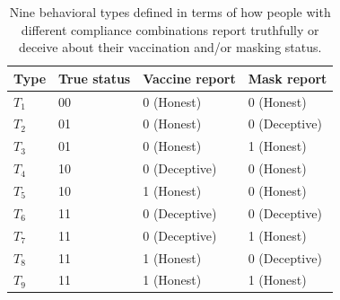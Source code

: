 \documentclass[sigconf,review]{acmart}
\begin{document}
\begin{table}[t]
\centering
\caption{Nine behavioral types defined in terms of how people with different compliance combinations report truthfully or deceive about their vaccination and/or masking status.}
\label{tab:truth-table-9types}
\begin{tabular}{l|l|l|l}
\hline
\textbf{Type} & \textbf{True status} & \textbf{Vaccine report} & \textbf{Mask report} \\
\hline
$T_1$ & 00 & 0 (Honest) & 0 (Honest) \\
$T_2$ & 01 & 0 (Honest) & 0 (Deceptive) \\
$T_3$ & 01 & 0 (Honest) & 1 (Honest) \\
$T_4$ & 10 & 0 (Deceptive) & 0 (Honest) \\
$T_5$ & 10 & 1 (Honest) & 0 (Honest) \\
$T_6$ & 11 & 0 (Deceptive) & 0 (Deceptive) \\
$T_7$ & 11 & 0 (Deceptive) & 1 (Honest) \\
$T_8$ & 11 & 1 (Honest) & 0 (Deceptive) \\
$T_9$ & 11 & 1 (Honest) & 1 (Honest) \\
\hline
\end{tabular}
\end{table}



\end{document}
